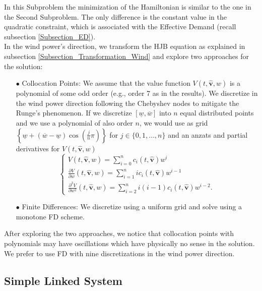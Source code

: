 In this Subproblem the minimization of the Hamiltonian is similar to the one in the Second Subproblem. The only difference is the constant value in the quadratic constraint, which is associated with the Effective Demand (recall subsection \ref{Subsection_ED}).\\
In the wind power's direction, we transform the HJB equation as explained in subsection \ref{Subsection_Transformation_Wind} and  explore two approaches for the solution:
\begin{enumerate}

\item[$\bullet$] Collocation Points: We assume that the value function $V(t,\hat{\bm{v}},w)$ is a polynomial of some odd order (e.g., order 7 as in the results). We discretize in the wind power direction following the Chebyshev nodes
to mitigate the Runge's phenomenon. If we discretize $[\underline{w},\overline{w}]$ into $n$ equal distributed points and we use a polynomial of also order $n$, we would use as grid $\left\{\underline{w}+\left(\overline{w}-\underline{w}\right)\cos\left(\frac{j}{n}\pi\right)\right\}$ for $j\in\{0,1,\dots,n\}$ and an anzats and partial derivatives for $V(t,\hat{\bm{v}},w)$
\begin{equation}
\begin{cases}
V(t,\hat{\bm{v}},w)=\sum_{i=0}^nc_i(t,\hat{\bm{v}})w^i\\
\frac{\partial V}{\partial w}(t,\hat{\bm{v}},w)=\sum_{i=1}^nic_i(t,\hat{\bm{v}})w^{i-1}\\
\frac{\partial^2V}{\partial w^2}(t,\hat{\bm{v}},w)=\sum_{i=2}^ni(i-1)c_i(t,\hat{\bm{v}})w^{i-2}.
\end{cases}
\end{equation}

\item[$\bullet$] Finite Differences: We discretize using a uniform grid and solve using a monotone FD scheme.

\end{enumerate}

After exploring the two approaches, we notice that collocation points with polynomials may have oscillations which have physically no sense in the solution. We prefer to use FD with nine discretizations in the wind power direction.

\subsection{Simple Linked System} \label{Fourth_Subproblem_Num}

